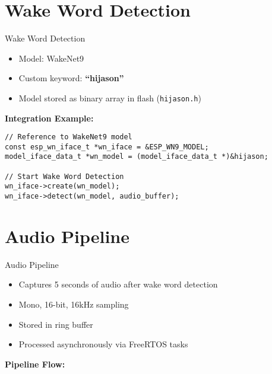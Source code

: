 \documentclass{beamer}
\begin{document}
\section{Wake Word Detection}
\begin{frame}[fragile]{Wake Word Detection}
  \begin{itemize}
    \item Model: WakeNet9
    \item Custom keyword: \textbf{``hijason''}
    \item Model stored as binary array in flash (\texttt{hijason.h})
  \end{itemize}

  \vspace{5mm}
  \textbf{Integration Example:}
  \begin{lstlisting}
// Reference to WakeNet9 model
const esp_wn_iface_t *wn_iface = &ESP_WN9_MODEL;
model_iface_data_t *wn_model = (model_iface_data_t *)&hijason;

// Start Wake Word Detection
wn_iface->create(wn_model);
wn_iface->detect(wn_model, audio_buffer);
  \end{lstlisting}
\end{frame}

\section{Audio Pipeline}
\begin{frame}{Audio Pipeline}
  \begin{itemize}
    \item Captures 5 seconds of audio after wake word detection
    \item Mono, 16-bit, 16kHz sampling
    \item Stored in ring buffer
    \item Processed asynchronously via FreeRTOS tasks
  \end{itemize}
  
  \vspace{5mm}
  \textbf{Pipeline Flow:}
  \begin{center}
  \end{center}
\end{frame}
\end{document}
